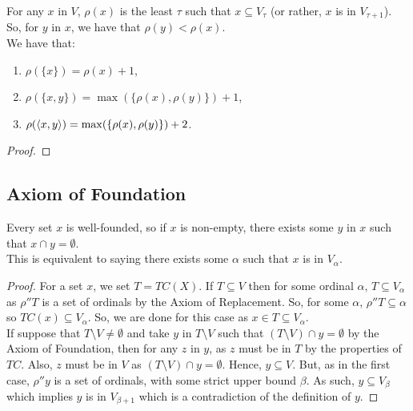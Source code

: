For any $x$ in $V$, $\rho(x)$ is the least 
$\tau$ such that $x \subseteq V_\tau$ (or rather, $x$ is in $V_{\tau + 1}$). 
So, for $y$ in $x$, we have that $\rho(y) < \rho(x)$.
\\[\baselineskip]
We have that: \begin{enumerate}
    \item $\rho(\{x\}) = \rho(x) + 1$,
    \item $\rho(\{x, y\}) = \max(\{\rho(x), \rho(y)\}) + 1$,
    \item $\rho({\langle x, y \rangle}) = \max(\{\rho(x), \rho(y)\}) + 2$.
\end{enumerate}

\begin{proof}
    
\end{proof}

\subsection{Axiom of Foundation}

Every set $x$ is well-founded, so if $x$ is non-empty, there exists
some $y$ in $x$ such that $x \cap y = \emptyset$.
\\[\baselineskip]
This is equivalent to saying there exists some $\alpha$ such that
$x$ is in $V_\alpha$.

\begin{proof}
    For a set $x$, we set $T = TC(X)$. 
    If $T \subseteq V$ then for some ordinal $\alpha$,
    $T \subseteq V_\alpha$ as $\rho''T$ is a set of ordinals by
    the Axiom of Replacement. So, for some $\alpha$, $\rho''T \subseteq \alpha$
    so $TC(x) \subseteq V_\alpha$. So, we are done for this case as
    $x \in T \subseteq V_\alpha$.
    \\[\baselineskip]
    If suppose that $T \setminus V \neq \emptyset$ and take $y$ in
    $T \setminus V$ such that $(T \setminus V) \cap y = \emptyset$
    by the Axiom of Foundation, then for any $z$ in $y$, 
    as $z$ must be in $T$ by the properties of $TC$.
    Also, $z$ must be in $V$ as $(T \setminus V) \cap y = \emptyset$.
    Hence, $y \subseteq V$. But, as in the first case, $\rho''y$ is a set
    of ordinals, with some strict upper bound $\beta$. As such, 
    $y \subseteq V_\beta$ which implies $y$ is in $V_{\beta + 1}$
    which is a contradiction of the definition of $y$.
\end{proof}
